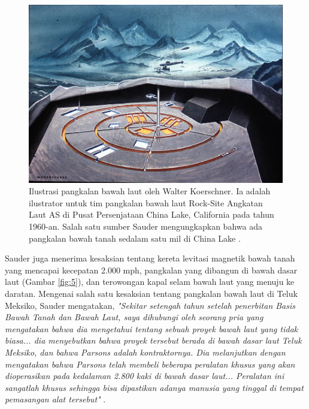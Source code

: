 \documentclass[10pt,twocolumn,letterpaper]{article}
\begin{document}
\begin{figure}[t]
\begin{center}
   \includegraphics[width=1\linewidth]{undersea.jpg}
\end{center}
   \caption{Ilustrasi pangkalan bawah laut oleh Walter Koerschner. Ia adalah ilustrator untuk tim pangkalan bawah laut Rock-Site Angkatan Laut AS di Pusat Persenjataan China Lake, California pada tahun 1960-an. Salah satu sumber Sauder mengungkapkan bahwa ada pangkalan bawah tanah sedalam satu mil di China Lake \cite{22,23}.}
\label{fig:5}
\label{fig:onecol}
\end{figure}

Sauder juga menerima kesaksian tentang kereta levitasi magnetik bawah tanah yang mencapai kecepatan 2.000 mph, pangkalan yang dibangun di bawah dasar laut (Gambar \ref{fig:5}), dan terowongan kapal selam bawah laut yang menuju ke daratan. Mengenai salah satu kesaksian tentang pangkalan bawah laut di Teluk Meksiko, Sauder mengatakan, \textit{"Sekitar setengah tahun setelah penerbitan Basis Bawah Tanah dan Bawah Laut, saya dihubungi oleh seorang pria yang mengatakan bahwa dia mengetahui tentang sebuah proyek bawah laut yang tidak biasa... dia menyebutkan bahwa proyek tersebut berada di bawah dasar laut Teluk Meksiko, dan bahwa Parsons adalah kontraktornya. Dia melanjutkan dengan mengatakan bahwa Parsons telah membeli beberapa peralatan khusus yang akan dioperasikan pada kedalaman 2.800 kaki di bawah dasar laut... Peralatan ini sangatlah khusus sehingga bisa dipastikan adanya manusia yang tinggal di tempat pemasangan alat tersebut"} \cite{22}.
\end{document}
